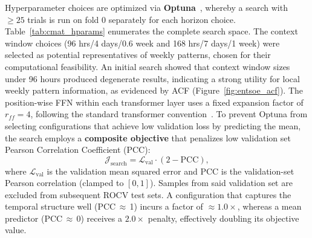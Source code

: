 Hyperparameter choices are optimized via \textbf{Optuna}~\cite{akiba_optuna_2019}, whereby a search with $ \geq 25$ trials is run on fold 0 separately for each horizon choice. Table~\ref{tab:cmat_hparams} enumerates the complete search space. The context window choices (96 hrs/4 days/0.6 week and 168 hrs/7 days/1 week) were selected as potential representatives of weekly patterns, chosen for their computational feasibility. An initial search showed that context window sizes under 96 hours produced degenerate results, indicating a strong utility for local weekly pattern information, as evidenced by ACF (Figure~\ref{fig:entsoe_acf}). The position-wise FFN within each transformer layer uses a fixed expansion factor of $r_{ff} = 4$, following the standard transformer convention~\cite{vaswani_attention_2023}. To prevent Optuna from selecting configurations that achieve low validation loss by predicting the mean, the search employs a \textbf{composite objective} that penalizes low validation set Pearson Correlation Coefficient (PCC):
\begin{equation}
    \mathcal{J}_{\text{search}} = \mathcal{L}_{\text{val}} \cdot (2 - \text{PCC}),
    \label{eq:composite_objective}
\end{equation}
where $\mathcal{L}_{\text{val}}$ is the validation mean squared error and PCC is the validation-set Pearson correlation (clamped to $[0, 1]$). Samples from said validation set are excluded from subsequent ROCV test sets. A configuration that captures the temporal structure well (PCC\,$\approx$\,1) incurs a factor of ${\approx}1.0\times$, whereas a mean predictor (PCC\,$\approx$\,0) receives a $2.0\times$ penalty, effectively doubling its objective value.


